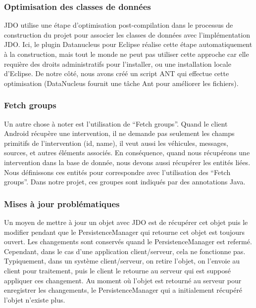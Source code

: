 \documentclass{article}
\begin{document}
\subsubsection{Optimisation des classes de données}

JDO utilise une étape d’optimisation post-compilation dans le processus de construction du projet pour associer les classes de données avec l’implémentation JDO. Ici, le plugin Datanucleus pour Eclipse réalise cette étape automatiquement à la construction, mais tout le monde ne peut pas utiliser cette approche car elle requière des droits administratifs pour l’installer, ou une installation locale d’Eclipse. De notre côté, nous avons créé un script ANT qui effectue cette optimisation (DataNucleus fournit une tâche Ant pour améliorer les fichiers).\\


\subsubsection{Fetch groups}

Un autre chose à noter est l’utilisation de “Fetch groups”. Quand le client Android récupère une intervention, il ne demande pas seulement les champs primitifs de l’intervention (id, name), il veut aussi les véhicules, messages, sources, et autres éléments associés. En conséquence, quand nous récupérons une intervention dans la base de donnée, nous devons aussi récupérer les entités liées. Nous définissons ces entités pour correspondre avec l’utilisation des “Fetch groups”. Dans notre projet, ces groupes sont indiqués par des annotations Java.\\


\subsubsection{Mises à jour problématiques}

Un moyen de mettre à jour un objet avec JDO est de récupérer cet objet puis le modifier pendant que le PersistenceManager qui retourne cet objet est toujours ouvert. Les changements sont conservés quand le PersistenceManager est refermé. Cependant, dans le cas d’une application client/serveur, cela ne fonctionne pas.\\


Typiquement, dans un système client/serveur, on retire l’objet, on l’envoie au client pour traitement, puis le client le retourne au serveur qui est supposé appliquer ces changement. Au moment où l’objet est retourné au serveur pour enregistrer les changements, le PersistenceManager qui a initialement récupéré l’objet n’existe plus.\\
\end{document}
